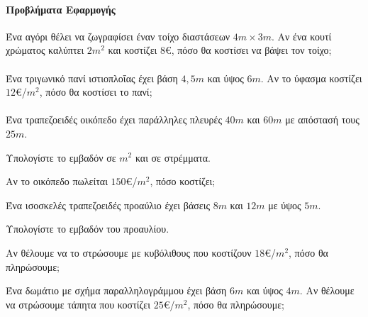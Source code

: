 \documentclass[11pt,a4paper,modern]{FFExercises}
\begin{document}



\paragraph{Προβλήματα Εφαρμογής}
\askhsh Ένα αγόρι θέλει να ζωγραφίσει έναν τοίχο διαστάσεων $4\si{m}\times 3\si{m}$. Αν ένα κουτί χρώματος καλύπτει $2\si{m^2}$ και κοστίζει $8$\euro, πόσο θα κοστίσει να βάψει τον τοίχο;\\\\

\askhsh Ένα τριγωνικό πανί ιστιοπλοΐας έχει βάση $4{,}5\si{m}$ και ύψος $6\si{m}$. Αν το ύφασμα κοστίζει $12$\euro/$\si{m^2}$, πόσο θα κοστίσει το πανί;\\\\

\askhsh Ένα τραπεζοειδές οικόπεδο έχει παράλληλες πλευρές $40\si{m}$ και $60\si{m}$ με απόστασή τους $25\si{m}$.
\begin{alist}
\item Υπολογίστε το εμβαδόν σε $\si{m^2}$ και σε στρέμματα.
\item Αν το οικόπεδο πωλείται $150$\euro/$\si{m^2}$, πόσο κοστίζει;
\end{alist}

\askhsh Ένα ισοσκελές τραπεζοειδές προαύλιο έχει βάσεις $8\si{m}$ και $12\si{m}$ με ύψος $5\si{m}$.
\begin{alist}
\item Υπολογίστε το εμβαδόν του προαυλίου.
\item Αν θέλουμε να το στρώσουμε με κυβόλιθους που κοστίζουν $18$\euro/$\si{m^2}$, πόσο θα πληρώσουμε;
\end{alist}

\askhsh Ένα δωμάτιο με σχήμα παραλληλογράμμου έχει βάση $6\si{m}$ και ύψος $4\si{m}$. Αν θέλουμε να στρώσουμε τάπητα που κοστίζει $25$\euro/$\si{m^2}$, πόσο θα πληρώσουμε;\\\\

\end{document}
